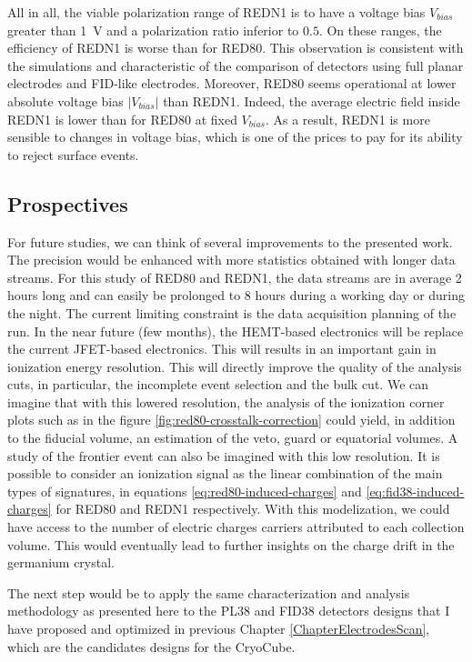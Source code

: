All in all, the viable polarization range of REDN1 is to have a voltage bias $V_{bias}$ greater than \SI{1}{\volt} and a polarization ratio inferior to $0.5$. On these ranges, the efficiency of REDN1 is worse than for RED80. This observation is consistent with the simulations and characteristic of the comparison of detectors using full planar electrodes and FID-like electrodes. Moreover, RED80 seems operational at lower absolute voltage bias $| V_{bias} |$ than REDN1. Indeed, the average electric field inside REDN1 is lower than for RED80 at fixed $V_{bias}$. As a result, REDN1 is more sensible to changes in voltage bias, which is one of the prices to pay for its ability to reject surface events.


\subsection{Prospectives}

For future studies, we can think of several improvements to the presented work.
The precision would be enhanced with more statistics obtained with longer data streams. For this study of RED80 and REDN1, the data streams are in average 2 hours long and can easily be prolonged to 8 hours during a working day or during the night. The current limiting constraint is the data acquisition planning of the run.
In the near future (few months), the HEMT-based electronics will be replace the current JFET-based electronics. This will results in an important gain in ionization energy resolution. This will directly improve the quality of the analysis cuts, in particular, the incomplete event selection and the bulk cut.
We can imagine that with this lowered resolution, the analysis of the ionization corner plots such as in the figure \ref{fig:red80-crosstalk-correction} could yield, in addition to the fiducial volume, an estimation of the veto, guard or equatorial volumes.
A study of the frontier event can also be imagined with this low resolution. It is possible to consider an ionization signal as the linear combination of the main types of signatures, in equations \ref{eq:red80-induced-charges} and \ref{eq:fid38-induced-charges} for RED80 and REDN1 respectively. With this modelization, we could have access to the number of electric charges carriers attributed to each collection volume. This would eventually lead to further insights on the charge drift in the germanium crystal.

The next step would be to apply the same characterization and analysis methodology as presented here to the PL38 and FID38 detectors designs that I have proposed and optimized in previous Chapter \ref{ChapterElectrodesScan}, which are the candidates designs for the CryoCube.

